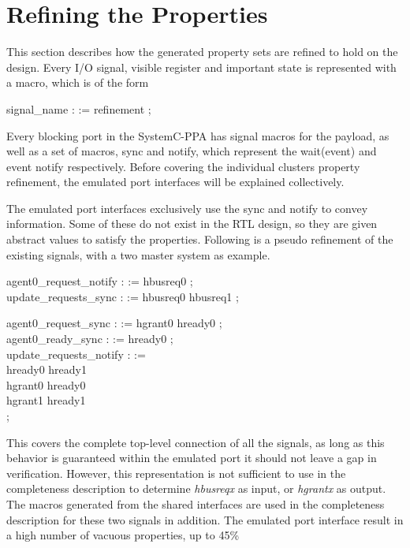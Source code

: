 \section{Refining the Properties}
\label{sec:refine}
This section describes how the generated property sets are refined to hold on the design. Every I/O signal, visible register and important state is represented with a macro, which is of the form \par  
{} signal\_name :  := refinement ; \par
Every blocking port in the SystemC-PPA has signal macros for the payload, as well as a set of macros, sync and notify, which represent the wait(event) and event notify respectively. Before covering the individual clusters property refinement, the emulated port interfaces will be explained collectively. \par
The emulated port interfaces exclusively use the sync and notify to convey information. Some of these do not exist in the RTL design, so they are given abstract values to satisfy the properties. Following is a pseudo refinement of the existing signals, with a two master system as example. \par
{} agent0\_request\_notify :  := hbusreq0 ; \\
 update\_requests\_sync :  := hbusreq0  hbusreq1 ; \par
{} agent0\_request\_sync :  := hgrant0  hready0 ; \\
 agent0\_ready\_sync :  := hready0 ; \\
 update\_requests\_notify :  := \\ hready0  hready1   \\  
hgrant0  hready0  \\ hgrant1  hready1 \\ ; \par
This covers the complete top-level connection of all the signals, as long as this behavior is guaranteed within the emulated port it should not leave a gap in verification. However, this representation is not sufficient to use in the completeness description to determine \textit{hbusreqx} as input, or \textit{hgrantx} as output. The macros generated from the shared interfaces are used in the completeness description for these two signals in addition. The emulated port interface result in a high number of vacuous properties, up to 45\% \par

